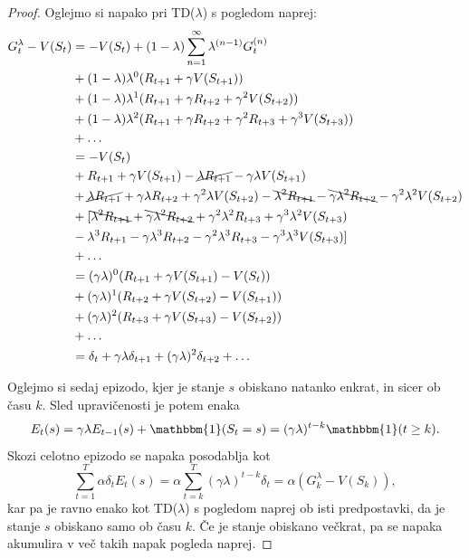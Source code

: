 \documentclass[12pt,a4paper]{amsart}
\theoremstyle{definition} %
\theoremstyle{plain} %
\begin{document}
\begin{proof} 
    Oglejmo si napako pri TD($\lambda$) s pogledom naprej:
    \begin{align*}
    G_t^\lambda - V(S_t) &= - V(S_t)  + (1 - \lambda) \sum_{n=1}^\infty \lambda^{(n-1)} G_t^{(n)} \\
                         &+ (1 - \lambda) \lambda^0 (R_{t+1} + \gamma V(S_{t+1})) \\
                         &+ (1 - \lambda) \lambda^1 (R_{t+1} + \gamma R_{t+2} + \gamma^2 V(S_{t+2})) \\
                         &+ (1 - \lambda) \lambda^2 (R_{t+1} + \gamma R_{t+2} + \gamma^2 R_{t+3} + \gamma^3 V(S_{t+3})) \\
                         &+ \dots \\
                         &= - V(S_t) \\
                         &+ R_{t+1} + \gamma V(S_{t+1}) - \cancel{\lambda R_{t+1}} - \gamma \lambda V(S_{t+1}) \\
                         &+ \cancel{\lambda R_{t+1}} + \gamma \lambda R_{t+2} + \gamma^2 \lambda V(S_{t+2}) - 
                                \bcancel{\lambda^2 R_{t+1}} - \bcancel{\gamma \lambda^2 R_{t+2}} - \gamma^2 \lambda^2 V(S_{t+2}) \\
                         &+ [\bcancel{\lambda^2 R_{t+1}} + \bcancel{\gamma \lambda^2 R_{t+2}} + \gamma^2 \lambda^2 R_{t+3} + \gamma^3 \lambda^2 V(S_{t+3}) \\
                         &- \lambda^3 R_{t+1} - \gamma \lambda^3 R_{t+2} - \gamma^2 \lambda^3 R_{t+3} - \gamma^3 \lambda^3 V(S_{t+3})] \\
                         &+ \dots \\
                         &= (\gamma \lambda)^0 (R_{t+1} + \gamma V(S_{t+1}) - V(S_t)) \\
                         &+ (\gamma \lambda)^1 (R_{t+2} + \gamma V(S_{t+2}) - V(S_{t+1})) \\
                         &+ (\gamma \lambda)^2 (R_{t+3} + \gamma V(S_{t+3}) - V(S_{t+2})) \\
                         &+ \dots \\
                         &= \delta_t + \gamma \lambda \delta_{t+1} + (\gamma \lambda)^2 \delta_{t+2} + \dots
    \end{align*}

    Oglejmo si sedaj epizodo, kjer je stanje $s$ obiskano natanko enkrat, in sicer ob času $k$. 
    Sled upravičenosti je potem enaka 
    $$
    E_t(s) = \gamma \lambda E_{t-1}(s) + \mathbbm{1}(S_t = s) = (\gamma \lambda)^{t-k} 
    \mathbbm{1}(t \geq k).
    $$
    Skozi celotno epizodo se napaka posodablja kot 
    $$
    \sum_{t=1}^T \alpha \delta_t E_t(s) = \alpha \sum_{t=k}^T (\gamma \lambda)^{t-k} \delta_t =
    \alpha (G_k^\lambda - V(S_k)),
    $$
    kar pa je ravno enako kot TD($\lambda$) s pogledom naprej ob isti predpostavki, da je stanje $s$ obiskano 
    samo ob času $k$. Če je stanje obiskano večkrat, pa se napaka akumulira v več takih napak pogleda naprej.
\end{proof}
\end{document}
